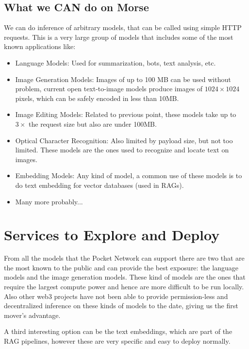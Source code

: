\subsection{What we CAN do on Morse}
We can do inference of arbitrary models, that can be called using simple HTTP requests. This is a very large group of models that includes some of the most known applications like:
\begin{itemize}
    \item Language Models: Used for summarization, bots, text analysis, etc.
    \item Image Generation Models: Images of up to 100 MB can be used without problem, current open text-to-image models produce images of $1024\times1024$ pixels, which can be safely encoded in less than 10MB.
    \item Image Editing Models: Related to previous point, these models take up to $3\times$ the request size but also are under 100MB.
    \item Optical Character Recognition: Also limited by payload size, but not too limited. These models are the ones used to recognize and locate text on images.
    \item Embedding Models: Any kind of model, a common use of these models is to do text embedding for vector databases (used in \glspl{RAG}).
    \item Many more probably...
\end{itemize}



\section{Services to Explore and Deploy}
From all the models that the Pocket Network can support there are two that are the most known to the public and can provide the best exposure: the language models and the image generation models. These kind of models are the ones that require the largest compute power and hence are more difficult to be run locally. Also other web3 projects have not been able to provide permission-less and decentralized inference on these kinds of models to the date, giving us the first mover's advantage.

A third interesting option can be the text embeddings, which are part of the \gls{RAG} pipelines, however these are very specific and easy to deploy normally.

